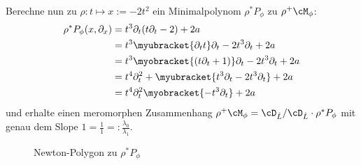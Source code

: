 Berechne nun zu $\rho:t\mapsto x:=-2t^2$ ein Minimalpolynom $\rho^*P_{\phi}$
zu $\rho^+\cM_{\phi}$:
\begin{align*}
\rho^*P_{\phi}(x,\partial_x)
  &=t^{3}\partial_t(t\partial_t-2)+2a\\
  &=t^{3}\myubracket{\partial_tt}\partial_t-2t^{3}\partial_t+2a\\
  &=t^{3}\myobracket{(t\partial_t+1)}\partial_t-2t^{3}\partial_t+2a\\
  &=t^{4}\partial_t^2+\myubracket{t^{3}\partial_t-2t^{3}\partial_t}+2a\\
  &=t^{4}\partial_t^2\myobracket{-t^{3}\partial_t}+2a
\end{align*}
und erhalte einen meromorphen Zusammenhang $\rho^+\cM_{\phi}=\cD_{\hat
L}/\cD_{\hat L}\cdot\rho^*P_{\phi}$ mit genau dem Slope
$1=\frac{1}{1}=:\frac{\lambda_0}{\lambda_1}$.
\begin{figure}[H]
\begin{center}
\end{center}
\caption{Newton-Polygon zu $\rho^*P_{\phi}$}
\end{figure}

